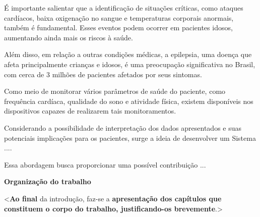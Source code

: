 É importante salientar que a identificação de situações críticas, como ataques cardíacos, baixa oxigenação no sangue e temperaturas corporais anormais, também é fundamental. Esses eventos podem ocorrer em pacientes idosos, aumentando ainda mais os riscos à saúde. 

Além disso, em relação a outras condições médicas, a epilepsia, uma doença que afeta principalmente crianças e idosos, é uma preocupação significativa no Brasil, com cerca de 3 milhões de pacientes afetados por seus sintomas. 

Como meio de monitorar vários parâmetros de saúde do paciente, como frequência cardíaca, qualidade do sono e atividade física, existem disponíveis nos dispositivos capazes de realizarem tais monitoramentos. 

Considerando a possibilidade de interpretação dos dados apresentados e suas potenciais implicações para os pacientes, surge a ideia de desenvolver um Sistema ....

Essa abordagem busca proporcionar uma possível contribuição ...

\vspace{0.5cm}
\textbf{Organização do trabalho}

\vspace{0.5cm}
<\textbf{Ao final} da introdução, faz-se a \textbf{apresentação dos capítulos que constituem o corpo do trabalho, justificando-os
brevemente}.>






\vspace{10mm} %

